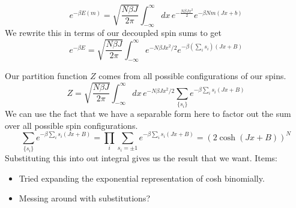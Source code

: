 \[
e^{ - \beta E(m)} = \sqrt{\frac{N \beta J}{2 \pi}} \int_{ - \infty}^{\infty} dx \, e^{ - \frac{N \beta J x^2}{2}}e^{ - \beta Nm(J x + b)}  
\]
We rewrite this in terms of our decoupled spin sums to get 
\[
e^{ - \beta E} = \sqrt{\frac{N \beta J }{2 \pi}} \int_{ - \infty}^\infty e^{ - N \beta J x^2 / 2}e^{ - \beta \left(  \sum_i s_i \right) (Jx + B)}
\]

Our partition function $Z$ comes from all possible configurations of our spins. 
\[	
Z = \sqrt{\frac{N \beta J}{2 \pi}} \int_{-\infty}^{\infty} dx \, e^{ - N \beta J x^2  / 2} \sum_{\{ s_i \}} e^{ - \beta \sum_i s_i (Jx +B)} 
\]
We can use the fact that we have a separable form here to factor out the sum over all possible spin configurations. 
\[	
\sum_{\{ s_i \}} e^{ - \beta \sum_i s_i (Jx + B) } = \prod_{i}\sum_{s_i = \pm 1} e^{ - \beta \sum_i s_i (Jx + B)} = (2 \cosh (Jx  +B))^N 
\]
Substituting this into out integral gives us the result that we want.
Items:
\begin{itemize}
\item Tried expanding the exponential representation of cosh binomially. 
\item Messing around with substitutions?
\end{itemize}

\pagebreak 
